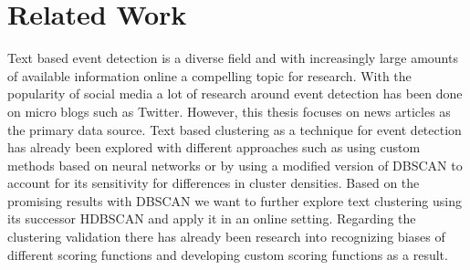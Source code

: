 \section{Related Work}
\label{sec:related_work}

Text based event detection is a diverse field and with increasingly large amounts of available information online a compelling topic for research.
With the popularity of social media a lot of research around event detection has been done on micro blogs\cite{microblog_clustering} such as Twitter\cite{twitter_survey}\cite{social_media_survey}.
However, this thesis focuses on news articles as the primary data source.
Text based clustering as a technique for event detection has already been explored with different approaches such as using custom methods based on neural networks\cite{text_clustering_topic_detection}
or by using a modified version of DBSCAN to account for its sensitivity for differences in cluster densities\cite{dbscan_martingale}.
Based on the promising results with DBSCAN we want to further explore text clustering using its successor HDBSCAN\cite{McInnes2017} and apply it in an online setting.
Regarding the clustering validation there has already been research into recognizing biases of different scoring functions \cite{Wu:2009:ARM:1557019.1557115}
and developing custom scoring functions as a result\cite{gates2017comparing}.
